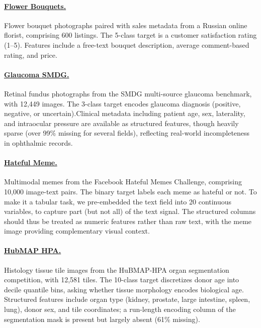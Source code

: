 \paragraph{\href{https://www.kaggle.com/datasets/olgabelitskaya/flower-color-images}{Flower Bouquets.}} Flower bouquet photographs paired with sales metadata from a Russian online florist, comprising 600 listings.
The 5-class target is a customer satisfaction rating (1--5).
Features include a free-text bouquet description, average comment-based rating, and price.


\paragraph{\href{https://www.kaggle.com/datasets/deathtrooper/multichannel-glaucoma-benchmark-dataset}{Glaucoma SMDG.}} Retinal fundus photographs from the SMDG multi-source glaucoma benchmark, with 12,449 images. The 3-class target encodes glaucoma diagnosis (positive, negative, or uncertain).Clinical metadata including patient age, sex, laterality, and intraocular pressure are available as structured features, though heavily sparse (over 99\% missing for several fields), reflecting real-world incompleteness in ophthalmic records.

\paragraph{\href{https://www.kaggle.com/datasets/parthplc/facebook-hateful-meme-dataset}{Hateful Meme.}} Multimodal memes from the Facebook Hateful Memes Challenge, comprising 10,000 image-text pairs.
The binary target labels each meme as hateful or not.
To make it a tabular task, we pre-embedded the text field into 20 continuous variables, to capture part (but not all) of the text signal. The structured columns should thus be treated as numeric features rather than raw text, with the meme image providing complementary visual context.

\paragraph{\href{https://www.kaggle.com/datasets/miquel0/hubmaphba-tiled-dataset-512x512}{HubMAP HPA.}} Histology tissue tile images from the HuBMAP-HPA organ segmentation competition, with 12,581 tiles. The 10-class target discretizes donor age into decile quantile bins, asking whether tissue morphology encodes biological age.
Structured features include organ type (kidney, prostate, large intestine, spleen, lung), donor sex, and tile coordinates; a run-length encoding column of the segmentation mask is present but largely absent (61\% missing).

